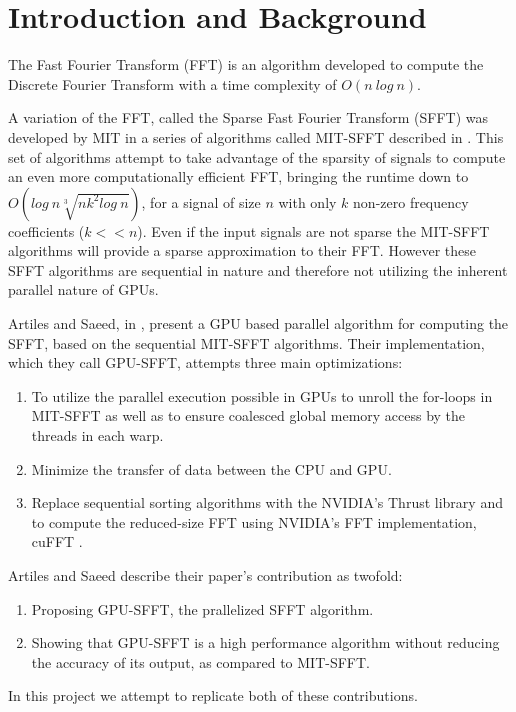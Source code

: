 
\section{Introduction and Background}
The Fast Fourier Transform (FFT) is an algorithm developed to compute the Discrete Fourier Transform with a time complexity of $O(n\ log\ n)$. 

A variation of the FFT, called the Sparse Fast Fourier Transform (SFFT) was developed by MIT in a series of algorithms called MIT-SFFT described in \cite{MIT-SFFT}.
This set of algorithms attempt to take advantage of the sparsity of signals to compute an even more computationally efficient FFT, bringing the runtime down to $O(log \ n\sqrt[3]{nk^2log\ n})$, for a signal of size $n$ with only $k$ non-zero frequency coefficients ($k<<n$).
Even if the input signals are not sparse the MIT-SFFT algorithms will provide a sparse approximation to their FFT. 
However these SFFT algorithms are sequential in nature and therefore not utilizing the inherent parallel nature of GPUs.

Artiles and Saeed, in \cite{GPU-SFFT}, present a GPU based parallel algorithm for computing the SFFT, based on the sequential MIT-SFFT algorithms.
Their implementation, which they call GPU-SFFT, attempts three main optimizations:
\begin{enumerate}
    \item To utilize the parallel execution possible in GPUs to  unroll the for-loops in MIT-SFFT as well as to ensure coalesced global memory access by the threads in each warp.
    \item Minimize the transfer of data between the CPU and GPU.
    \item Replace sequential sorting algorithms with the NVIDIA's Thrust library \cite{thrust} and to compute the reduced-size FFT using NVIDIA's FFT implementation, cuFFT \cite{cuFFT}.  
\end{enumerate}

Artiles and Saeed describe their paper's contribution as twofold:
\begin{enumerate}
    \item Proposing GPU-SFFT, the prallelized SFFT algorithm.
    \item Showing that GPU-SFFT is a high performance algorithm without reducing the accuracy of its output, as compared to MIT-SFFT.
\end{enumerate}

In this project we attempt to replicate both of these contributions. 

